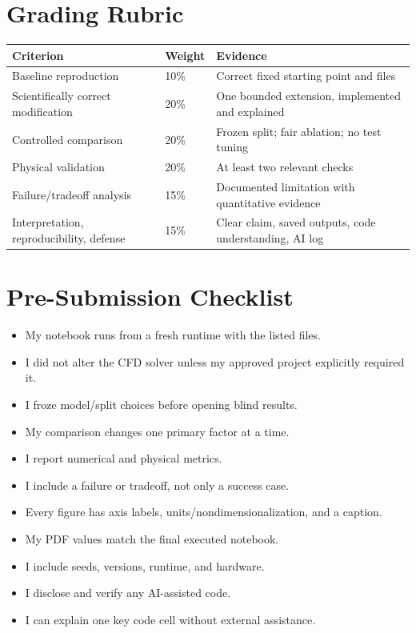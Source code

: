 \documentclass[11pt]{article}
\begin{document}
\section{Grading Rubric}
\begin{tabularx}{\textwidth}{@{}p{}p{}Y@{}}
\toprule
\textbf{Criterion} & \textbf{Weight} & \textbf{Evidence}\\
\midrule
Baseline reproduction & 10\% & Correct fixed starting point and files\\
Scientifically correct modification & 20\% & One bounded extension, implemented and explained\\
Controlled comparison & 20\% & Frozen split; fair ablation; no test tuning\\
Physical validation & 20\% & At least two relevant checks\\
Failure/tradeoff analysis & 15\% & Documented limitation with quantitative evidence\\
Interpretation, reproducibility, defense & 15\% & Clear claim, saved outputs, code understanding, AI log\\
\bottomrule
\end{tabularx}

\section{Pre-Submission Checklist}
\begin{itemize}[label=$\square$]
\item My notebook runs from a fresh runtime with the listed files.
\item I did not alter the CFD solver unless my approved project explicitly required it.
\item I froze model/split choices before opening blind results.
\item My comparison changes one primary factor at a time.
\item I report numerical and physical metrics.
\item I include a failure or tradeoff, not only a success case.
\item Every figure has axis labels, units/nondimensionalization, and a caption.
\item My PDF values match the final executed notebook.
\item I include seeds, versions, runtime, and hardware.
\item I disclose and verify any AI-assisted code.
\item I can explain one key code cell without external assistance.
\end{itemize}
\end{document}
